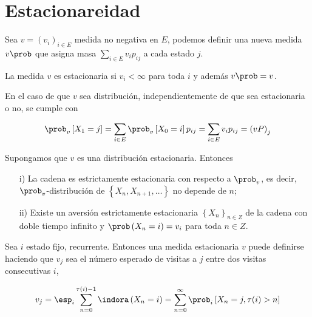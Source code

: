 %
\section{Estacionareidad}

Sea $v=\left(v_{i}\right)_{i\in E}$ medida no negativa en $E$, podemos definir una nueva medida $v\prob$ que asigna masa $\sum_{i\in E}v_{i}p_{ij}$ a cada estado $j$.

\begin{Def}
La medida $v$ es estacionaria si $v_{i}<\infty$ para toda $i$ y adem\'as $v\prob=v$.
\end{Def}
En el caso de que $v$ sea distribuci\'on, independientemente de que sea estacionaria o no, se cumple con

\begin{eqnarray*}
\prob_{v}\left[X_{1}=j\right]=\sum_{i\in E}\prob_{v}\left[X_{0}=i\right]p_{ij}=\sum_{i\in E}v_{i}p_{ij}=\left(vP\right)_{j}
\end{eqnarray*}

\begin{Teo}
Supongamos que $v$ es una distribuci\'on estacionaria. Entonces
\begin{itemize}
\item[i)] La cadena es estrictamente estacionaria con respecto a
$\prob_{v}$, es decir, $\prob_{v}$-distribuci\'on de $\left\{X_{n},X_{n+1},\ldots\right\}$ no depende de $n$;
\item[ii)] Existe un aversi\'on estrictamente estacionaria $\left\{X_{n}\right\}_{n\in Z}$ de la cadena con doble tiempo infinito y $\prob\left(X_{n}=i\right)=v_{i}$ para toda $n\in Z$.
\end{itemize}
\end{Teo}

\begin{Teo}
Sea $i$ estado fijo, recurrente. Entonces una medida estacionaria $v$ puede definirse haciendo que $v_{j}$ sea el n\'umero esperado de visitas a $j$ entre dos visitas consecutivas $i$,

\begin{equation}\label{Eq.3.1}
v_{j}=\esp_{i}\sum_{n=0}^{\tau(i)-1}\indora\left(X_{n}=i\right)=\sum_{n=0}^{\infty}\prob_{i}\left[X_{n}=j,\tau(i)>n\right]
\end{equation}
\end{Teo}

